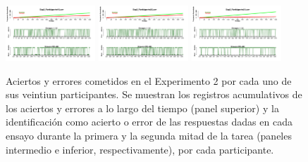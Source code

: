 \documentclass[a4paper ]{article}
\begin{document}
\begin{figure}[th]
\includegraphics[width=0.3\textwidth]{Figures/Success_Exp2_P19} \includegraphics[width=0.3\textwidth]{Figures/Success_Exp2_P20} \includegraphics[width=0.3\textwidth]{Figures/Success_Exp2_P21} 
\caption[Aciertos y Errores a lo largo del tiempo; Experimento 2]{Aciertos y errores cometidos en el Experimento 2 por cada uno de sus veintiun participantes. Se muestran los registros acumulativos de los aciertos y errores a lo largo del tiempo (panel superior) y la identificación como acierto o error de las respuestas dadas en cada ensayo durante la primera y la segunda mitad de la tarea (paneles intermedio e inferior, respectivamente), por cada participante.}
\label{fig:Success_E2}
\end{figure}
\end{document}
